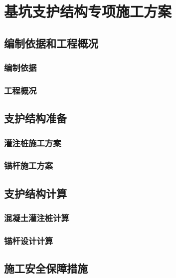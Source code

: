 \section{基坑支护结构专项施工方案}
\subsection{编制依据和工程概况}
\subsubsection{编制依据}

\subsubsection{工程概况}

\subsection{支护结构准备}
\subsubsection{灌注桩施工方案}

\subsubsection{锚杆施工方案}

\subsection{支护结构计算}
\subsubsection{混凝土灌注桩计算}

\subsubsection{锚杆设计计算}

\subsection{施工安全保障措施}
